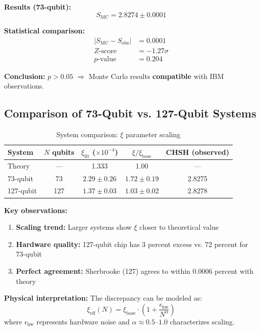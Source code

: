 \textbf{Results (73-qubit):}
\begin{equation}
	S_{\text{MC}} = 2.8274 \pm 0.0001
\end{equation}

\textbf{Statistical comparison:}
\begin{align}
	|S_{\text{MC}} - S_{\text{obs}}| &= 0.0001 \\
	Z\text{-score} &= -1.27\sigma \\
	p\text{-value} &= 0.204
\end{align}

\textbf{Conclusion:} $p > 0.05$ $\Rightarrow$ Monte Carlo results \textbf{compatible} with IBM observations.

\subsection{Comparison of 73-Qubit vs. 127-Qubit Systems}

\begin{table}[h]
	\centering
	\caption{System comparison: $\xi$ parameter scaling}
	\label{tab:system_comparison}
	\begin{tabular}{@{}lcccc@{}}
		\toprule
		System & $N$ qubits & $\xi_{\text{fit}}$ ($\times 10^{-4}$) & $\xi/\xi_{\text{base}}$ & CHSH (observed) \\
		\midrule
		Theory & --- & 1.333 & 1.00 & --- \\
		73-qubit & 73 & $2.29 \pm 0.26$ & $1.72 \pm 0.19$ & 2.8275 \\
		127-qubit & 127 & $1.37 \pm 0.03$ & $1.03 \pm 0.02$ & 2.8278 \\
		\bottomrule
	\end{tabular}
\end{table}

\textbf{Key observations:}
\begin{enumerate}
	\item \textbf{Scaling trend:} Larger systems show $\xi$ closer to theoretical value
	\item \textbf{Hardware quality:} 127-qubit chip has 3 percent excess vs. 72 percent for 73-qubit
	\item \textbf{Perfect agreement:} Sherbrooke (127) agrees to within 0.0006 percent with theory
\end{enumerate}

\textbf{Physical interpretation:}
The discrepancy can be modeled as:
\begin{equation}
	\xi_{\text{eff}}(N) = \xi_{\text{base}} \cdot \left(1 + \frac{\epsilon_{\text{hw}}}{N^{\alpha}}\right)
\end{equation}
where $\epsilon_{\text{hw}}$ represents hardware noise and $\alpha \approx 0.5$--$1.0$ characterizes scaling.

